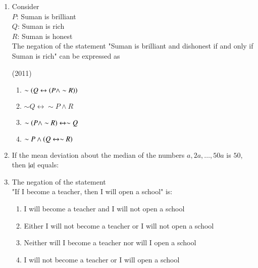 \documentclass[journal,12pt,twocolumn]{IEEEtran}
\theoremstyle{remark}
\begin{document}
\begin{enumerate}
    \item Consider \\
    \quad $P$: Suman is brilliant\\
    \quad $Q$: Suman is rich\\
    \quad $R$: Suman is honest\\
    The negation of the statement "Suman is brilliant and dishonest if and only if Suman is rich" can be expressed as
    
    \hfill{(2011)}
    \begin{enumerate}[label=(\alph*)]
    \item $\sim \left(Q \leftrightarrow \left(P \land \sim R\right)\right)$
    \item $\sim Q \leftrightarrow \sim P \land R$
    \item $\sim \left(P \land \sim R\right) \leftrightarrow \sim Q$
    \item $\sim P \land \left(Q \leftrightarrow \sim R\right)$
    \end{enumerate}
    
    \item If the mean deviation about the median of the numbers $a, 2a, \dots, 50a$ is $50$, then $\left\vert a\right\vert$ equals:
    
    \hfill{}
    \begin{enumerate}[label=(\alph*)]
    \end{enumerate}
    
    \item The negation of the statement\\
    "If I become a teacher, then I will open a school" is:
    
    \hfill{}
    \begin{enumerate}[label=(\alph*)]
        \item I will become a teacher and I will not open a school
        \item Either I will not become a teacher or I will not open a school
        \item Neither will I become a teacher nor will I open a school
        \item I will not become a teacher or I will open a school
    \end{enumerate}
    

\end{enumerate}
\end{document}

